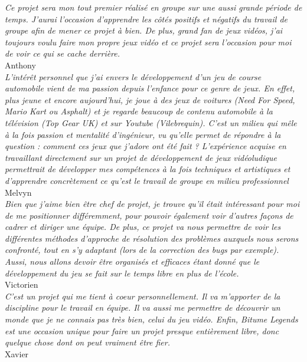 \documentclass[12pt,a4paper]{article}
\begin{document}
\indent\textit{Ce projet sera mon tout premier réalisé en groupe sur une aussi grande période de temps. 
    J'aurai l'occasion d'apprendre les côtés positifs et négatifs du travail de groupe afin de mener ce 
    projet à bien. De plus, grand fan de jeux vidéos, j'ai toujours voulu faire mon propre jeux vidéo et ce 
projet sera l'occasion pour moi de voir ce qui se cache derrière.} \\
\indent Anthony\\[0.3cm]
\indent\textit{L'intérêt personnel que j'ai envers le développement d'un jeu de course automobile vient de ma 
    passion depuis l'enfance pour ce genre de jeux. En effet, plus jeune et encore aujourd’hui, je joue
    à des jeux de voitures (Need For Speed, Mario Kart ou Asphalt) et je regarde beaucoup de contenu automobile
    à la télévision (Top Gear UK) et sur Youtube (Vilebrequin). C'est un milieu qui mêle à la fois passion et 
    mentalité d'ingénieur, vu qu'elle permet de répondre à la question : comment ces jeux que j'adore ont été 
    fait ? L'expérience acquise en travaillant directement sur un projet de développement de jeux vidéoludique 
    permettrait de développer mes compétences à la fois techniques et artistiques et d'apprendre concrètement 
ce qu'est le travail de groupe en milieu professionnel} \\
\indent Melvyn\\[0.3cm]
\indent\textit{Bien que j'aime bien être chef de projet, je trouve qu'il était intéressant 
    pour moi de me positionner différemment, pour pouvoir également voir d'autres façons 
    de cadrer et diriger une équipe. De plus, ce projet va nous permettre de voir les différentes
    méthodes d'approche de résolution des problèmes auxquels nous serons confronté, tout en s'y
    adaptant (lors de la correction des bugs par exemple). Aussi, nous allons devoir être organisés
et efficaces étant donné que le développement du jeu se fait sur le temps libre en plus de l'école.} \\
\indent Victorien\\[0.3cm]
\indent\textit{C'est un projet qui me tient à coeur personnellement. Il va m'apporter de la discipline pour le travail
    en équipe. Il va aussi me permettre de découvrir un monde que je ne connais pas très bien, celui du jeu vidéo.
    Enfin, Bitume Legends est une occasion unique pour faire un projet presque entièrement libre, donc quelque
chose dont on peut vraiment être fier.} \\
\indent Xavier
\clearpage
\end{document}
